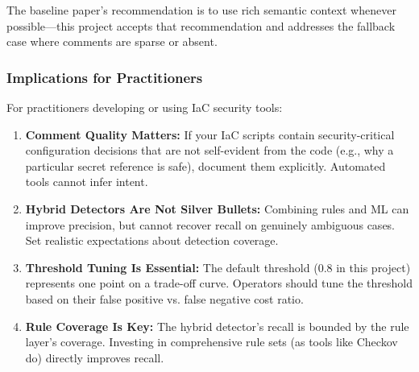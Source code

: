 The baseline paper's recommendation is to use rich semantic context whenever possible—this project accepts that recommendation and addresses the fallback case where comments are sparse or absent.

\subsubsection{Implications for Practitioners}

For practitioners developing or using IaC security tools:
\begin{enumerate}
  \item \textbf{Comment Quality Matters:} If your IaC scripts contain security-critical configuration decisions that are not self-evident from the code (e.g., why a particular secret reference is safe), document them explicitly. Automated tools cannot infer intent.
  
  \item \textbf{Hybrid Detectors Are Not Silver Bullets:} Combining rules and ML can improve precision, but cannot recover recall on genuinely ambiguous cases. Set realistic expectations about detection coverage.
  
  \item \textbf{Threshold Tuning Is Essential:} The default threshold (0.8 in this project) represents one point on a trade-off curve. Operators should tune the threshold based on their false positive vs. false negative cost ratio.
  
  \item \textbf{Rule Coverage Is Key:} The hybrid detector's recall is bounded by the rule layer's coverage. Investing in comprehensive rule sets (as tools like Checkov do) directly improves recall.
\end{enumerate}
